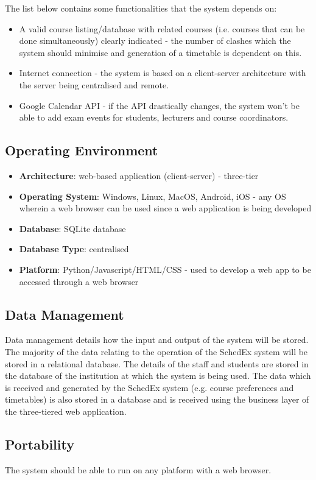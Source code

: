 \documentclass{article}
\begin{document}
The list below contains some functionalities that the system depends on:

\begin{itemize}
\item A valid course listing/database with related courses (i.e. courses that can be done simultaneously) clearly indicated - the number of clashes which the system should minimise and generation of a timetable is dependent on this.
\item Internet connection - the system is based on a client-server architecture with the server being centralised and remote.
\item Google Calendar API - if the API drastically changes, the system won't be able to add exam events for students, lecturers and course coordinators.
\end{itemize}

\subsection{Operating Environment}

\begin{itemize}
\item \textbf{Architecture}: web-based application (client-server) - three-tier
\item \textbf{Operating System}: Windows, Linux, MacOS, Android, iOS - any OS wherein a web browser can be used since a web application is being developed
\item \textbf{Database}: SQLite database
\item \textbf{Database Type}: centralised
\item \textbf{Platform}: Python/Javascript/HTML/CSS - used to develop a web app to be accessed through a web browser
\end{itemize}

\subsection{Data Management}

Data management details how the input and output of the system will be stored. The majority of the data relating to the operation of the SchedEx system will be stored in a relational database. The details of the staff and students are stored in the database of the institution at which the system is being used. The data which is received and generated by the SchedEx system (e.g. course preferences and timetables) is also stored in a database and is received using the business layer of the three-tiered web application.

\subsection{Portability}

The system should be able to run on any platform with a web browser.
\end{document}
